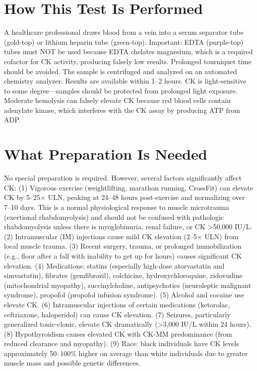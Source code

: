 \section*{How This Test Is Performed}
A healthcare professional draws blood from a vein into a serum separator tube (gold-top) or lithium heparin tube (green-top). Important: EDTA (purple-top) tubes must NOT be used because EDTA chelates magnesium, which is a required cofactor for CK activity, producing falsely low results. Prolonged tourniquet time should be avoided. The sample is centrifuged and analyzed on an automated chemistry analyzer. Results are available within 1--2 hours. CK is light-sensitive to some degree---samples should be protected from prolonged light exposure. Moderate hemolysis can falsely elevate CK because red blood cells contain adenylate kinase, which interferes with the CK assay by producing ATP from ADP.

\section*{What Preparation Is Needed}
No special preparation is required. However, several factors significantly affect CK: (1) Vigorous exercise (weightlifting, marathon running, CrossFit) can elevate CK by 5--25$\times$ ULN, peaking at 24--48 hours post-exercise and normalizing over 7--10 days. This is a normal physiological response to muscle microtrauma (exertional rhabdomyolysis) and should not be confused with pathologic rhabdomyolysis unless there is myoglobinuria, renal failure, or CK >50,000 IU/L. (2) Intramuscular (IM) injections cause mild CK elevation (2--5$\times$ ULN) from local muscle trauma. (3) Recent surgery, trauma, or prolonged immobilization (e.g., floor after a fall with inability to get up for hours) causes significant CK elevation. (4) Medications: statins (especially high-dose atorvastatin and simvastatin), fibrates (gemfibrozil), colchicine, hydroxychloroquine, zidovudine (mitochondrial myopathy), succinylcholine, antipsychotics (neuroleptic malignant syndrome), propofol (propofol infusion syndrome). (5) Alcohol and cocaine use elevate CK. (6) Intramuscular injections of certain medications (ketorolac, ceftriaxone, haloperidol) can cause CK elevation. (7) Seizures, particularly generalized tonic-clonic, elevate CK dramatically (>3,000 IU/L within 24 hours). (8) Hypothyroidism causes elevated CK with CK-MM predominance (from reduced clearance and myopathy). (9) Race: black individuals have CK levels approximately 50--100\% higher on average than white individuals due to greater muscle mass and possible genetic differences.

